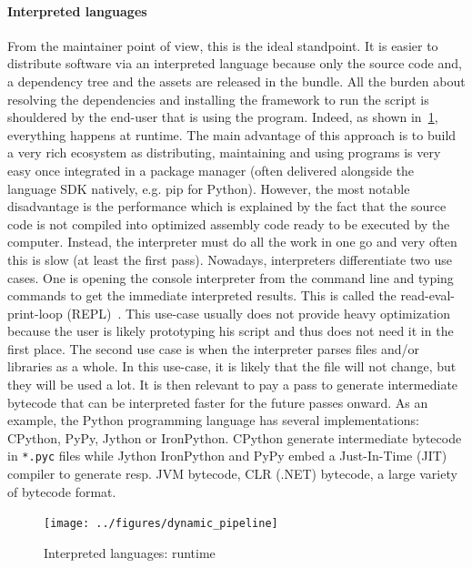 \paragraph{Interpreted languages} From the maintainer point of view, this is the ideal standpoint. It is easier to
distribute software via an interpreted language because only the source code and, a dependency tree and the assets are
released in the bundle. All the burden about resolving the dependencies and installing the framework to run the script
is shouldered by the end-user that is using the program. Indeed, as shown in~\cref{fig:static.dynamic.dynamic.pipeline},
everything happens at runtime. The main advantage of this approach is to build a very rich ecosystem as distributing,
maintaining and using programs is very easy once integrated in a package manager (often delivered alongside the language
SDK natively, e.g. pip for Python). However, the most notable disadvantage is the performance which is explained by the
fact that the source code is not compiled into optimized assembly code ready to be executed by the computer. Instead,
the interpreter must do all the work in one go and very often this is slow (at least the first pass). Nowadays,
interpreters differentiate two use cases. One is opening the console interpreter from the command line and typing
commands to get the immediate interpreted results. This is called the read-eval-print-loop
(REPL)~\parencite{vanbinsbergen.2020.repl}. This use-case usually does not provide heavy optimization because the user
is likely prototyping his script and thus does not need it in the first place. The second use case is when the
interpreter parses files and/or libraries as a whole. In this use-case, it is likely that the file will not change, but
they will be used a lot. It is then relevant to pay a pass to generate intermediate bytecode that can be interpreted
faster for the future passes onward. As an example, the Python programming language has several implementations:
CPython, PyPy, Jython or IronPython. CPython generate intermediate bytecode in \texttt{*.pyc} files while Jython
IronPython and PyPy embed a Just-In-Time (JIT) compiler to generate resp. JVM bytecode, CLR (.NET) bytecode, a large
variety of bytecode format.

\begin{figure}[htbp]
  \centering
  \texttt{[image: ../figures/dynamic\_pipeline]}
  \caption{Interpreted languages: runtime}
  \label{fig:static.dynamic.dynamic.pipeline}
\end{figure}

